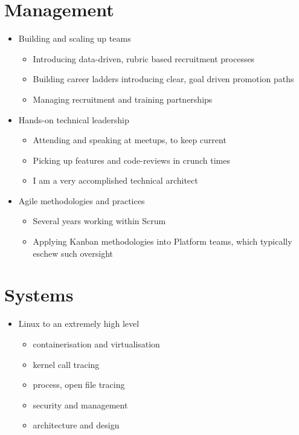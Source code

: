 \documentclass[11pt,a4paper,sans]{article}
\begin{document}
\section{Management}

\begin{itemize}
\item Building and scaling up teams
  \begin{itemize}
  \item Introducing data-driven, rubric based recruitment processes
  \item Building career ladders introducing clear, goal driven promotion paths
  \item Managing recruitment and training partnerships
  \end{itemize}
\item Hands-on technical leadership
  \begin{itemize}
  \item Attending and speaking at meetups, to keep current
  \item Picking up features and code-reviews in crunch times
  \item I am a very accomplished technical architect
  \end{itemize}
\item Agile methodologies and practices
  \begin{itemize}
  \item Several years working within Scrum
  \item Applying Kanban methodologies into Platform teams, which typically eschew such oversight
  \end{itemize}
\end{itemize}

\section{Systems}

\begin{itemize}
\item Linux to an extremely high level
  \begin{itemize}
  \item containerisation and virtualisation
  \item kernel call tracing
  \item process, open file tracing
  \item security and management
  \item architecture and design
  \end{itemize}
\end{itemize}
\end{document}
